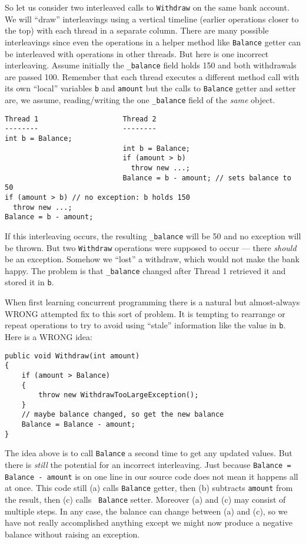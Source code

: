 \documentclass[10pt]{article}
\begin{document}
So let us consider two interleaved calls to {\tt Withdraw} on the same
bank account.  We will ``draw'' interleavings using a vertical
timeline (earlier operations closer to the top) with each thread in a
separate column.  There are many possible interleavings since even the
operations in a helper method like {\tt Balance} getter can be interleaved
with operations in other threads.  But here is one incorrect
interleaving.  Assume initially the {\tt \_balance} field holds 150 and
both withdrawals are passed 100.  Remember that each thread executes a
different method call with its own ``local'' variables {\tt b} and
{\tt amount} but the calls to {\tt Balance} getter and setter 
are, we assume, reading/writing the one {\tt \_balance} field of the
\emph{same} object.

\begin{verbatim}
Thread 1                    Thread 2
--------                    --------
int b = Balance;
                            int b = Balance;
                            if (amount > b)
                              throw new ...;
                            Balance = b - amount; // sets balance to 50
if (amount > b) // no exception: b holds 150
  throw new ...;
Balance = b - amount;
\end{verbatim}

If this interleaving occurs, the resulting {\tt \_balance} will be 50
and no exception will be thrown.  But two {\tt Withdraw} operations
were supposed to occur --- there \emph{should} be an exception.
Somehow we ``lost'' a withdraw, which would not make the bank happy.
The problem is that {\tt \_balance} changed after Thread 1 retrieved it
and stored it in {\tt b}.

When first learning concurrent programming there is a natural but
almost-always WRONG attempted fix to this sort of problem.  It is tempting
to rearrange or repeat operations to try to avoid using ``stale''
information like the value in {\tt b}.  Here is a WRONG idea:
\begin{verbatim}
public void Withdraw(int amount)
{
    if (amount > Balance)
    {
        throw new WithdrawTooLargeException();
    }
    // maybe balance changed, so get the new balance
    Balance = Balance - amount;
}
\end{verbatim}
The idea above is to call {\tt Balance} a second time to get any
updated values.  But there is \emph{still} the potential for an
incorrect interleaving.  Just because {\tt Balance = Balance -
  amount} is on one line in our source code does not mean it happens
all at once.  This code still (a) calls {\tt Balance} getter, then (b)
subtracts {\tt amount} from the result, then (c) calls {\tt
  Balance} setter.  Moreover (a) and (c) may consist of multiple steps.
In any case, the balance can change between (a) and (c), so we have
not really accomplished anything except we might now produce a
negative balance without raising an exception.
\end{document}
